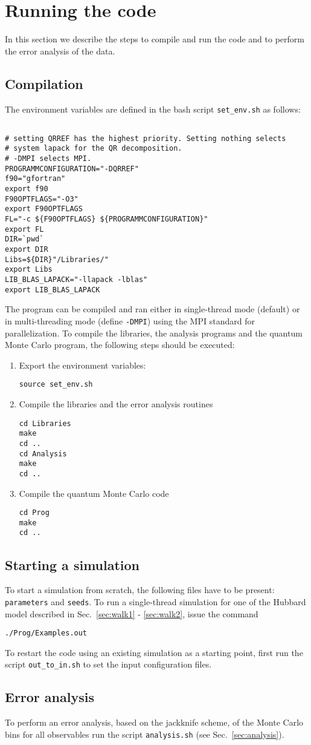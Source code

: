 \section{Running the code}\label{sec:running}
In this section we describe the steps to compile and run the code and to perform the error analysis of the data.


\subsection{Compilation}
The environment variables are defined in the bash script \texttt{set\_env.sh} as follows:
\lstset{style=custombash}
\begin{lstlisting}

# setting QRREF has the highest priority. Setting nothing selects 
# system lapack for the QR decomposition.
# -DMPI selects MPI.
PROGRAMMCONFIGURATION="-DQRREF"
f90="gfortran"
export f90
F90OPTFLAGS="-O3"
export F90OPTFLAGS
FL="-c ${F90OPTFLAGS} ${PROGRAMMCONFIGURATION}"
export FL
DIR=`pwd`
export DIR
Libs=${DIR}"/Libraries/"
export Libs
LIB_BLAS_LAPACK="-llapack -lblas"
export LIB_BLAS_LAPACK

\end{lstlisting}
The program can be compiled and ran either in single-thread mode (default) or 
in multi-threading mode (define \texttt{-DMPI}) using the MPI standard for parallelization.
To compile the libraries, the analysis programs and the quantum Monte Carlo program, the following steps should be executed:
\begin{enumerate}
\item Export  the environment variables:
\begin{verbatim}
source set_env.sh
\end{verbatim}
\item Compile the libraries and the error analysis routines
\begin{verbatim}
cd Libraries
make
cd ..
cd Analysis
make
cd ..
\end{verbatim}
\item Compile the quantum Monte Carlo code
\begin{verbatim}
cd Prog
make
cd ..
\end{verbatim}
\end{enumerate}


\subsection{Starting a simulation}
To start a simulation from scratch, the following files have to be present: \texttt{parameters} and \texttt{seeds}. 
To run a single-thread simulation for one of the  Hubbard model described in Sec.~\ref{sec:walk1} - \ref{sec:walk2}, issue the command
\begin{verbatim}
./Prog/Examples.out
\end{verbatim}
To restart the code using an existing simulation as a starting point, first run the script \texttt{out\_to\_in.sh} to set 
the input configuration files.

\subsection{Error analysis}
To perform an error analysis, based on the jackknife scheme, of the Monte Carlo bins for all observables run the script \texttt{analysis.sh} 
(see Sec.~\ref{sec:analysis}).

 



